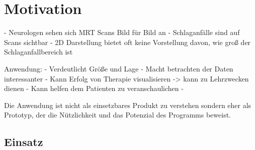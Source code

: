 
\chapter{Motivation}

- Neurologen sehen sich MRT Scans Bild für Bild an
- Schlaganfälle sind auf Scans sichtbar
- 2D Darstellung bietet oft keine Vorstellung davon, wie groß der Schlaganfallbereich ist


Anwendung:
- Verdeutlicht Größe und Lage
- Macht betrachten der Daten interessanter
- Kann Erfolg von Therapie visualisieren
-> kann zu Lehrzwecken dienen
- Kann helfen dem Patienten zu veranschaulichen
- 


Die Anwendung ist nicht als einsetzbares Produkt zu verstehen sondern eher als Prototyp, der die Nützlichkeit und das Potenzial des Programms beweist.

\section{Einsatz}

